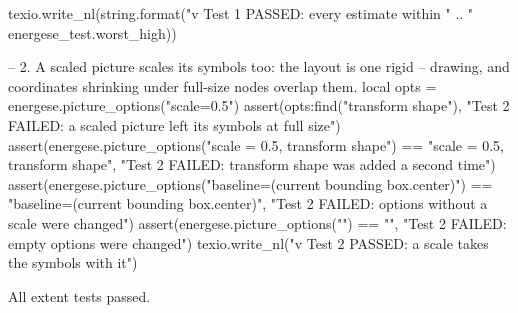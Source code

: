 \documentclass{article}
\begin{document}
\begin{luacode*}
    texio.write_nl(string.format("v Test 1 PASSED: every estimate within "
        .. "%
        energese_test.worst_high))

    -- 2. A scaled picture scales its symbols too: the layout is one rigid
    --    drawing, and coordinates shrinking under full-size nodes overlap them.
    local opts = energese.picture_options("scale=0.5")
    assert(opts:find("transform shape"),
           "Test 2 FAILED: a scaled picture left its symbols at full size")
    assert(energese.picture_options("scale = 0.5, transform shape")
               == "scale = 0.5, transform shape",
           "Test 2 FAILED: transform shape was added a second time")
    assert(energese.picture_options("baseline=(current bounding box.center)")
               == "baseline=(current bounding box.center)",
           "Test 2 FAILED: options without a scale were changed")
    assert(energese.picture_options("") == "",
           "Test 2 FAILED: empty options were changed")
    texio.write_nl("v Test 2 PASSED: a scale takes the symbols with it")
\end{luacode*}

All extent tests passed.
\end{document}
